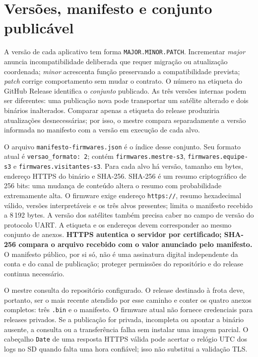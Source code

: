 \section{Versões, manifesto e conjunto publicável}
A versão de cada aplicativo tem forma \texttt{MAJOR.MINOR.PATCH}. Incrementar \emph{major} anuncia incompatibilidade deliberada que requer migração ou atualização coordenada; \emph{minor} acrescenta função preservando a compatibilidade prevista; \emph{patch} corrige comportamento sem mudar o contrato. O número na etiqueta do GitHub Release identifica o \emph{conjunto} publicado. As três versões internas podem ser diferentes: uma publicação nova pode transportar um satélite alterado e dois binários inalterados. Comparar apenas a etiqueta do release produziria atualizações desnecessárias; por isso, o mestre compara separadamente a versão informada no manifesto com a versão em execução de cada alvo.

O arquivo \texttt{manifesto-firmwares.json} é o índice desse conjunto. Seu formato atual é \texttt{versao\_formato: 2}; contém \texttt{firmwares.mestre-s3}, \texttt{firmwares.equipe-s3} e \texttt{firmwares.visitantes-s3}. Para cada alvo há versão, tamanho em bytes, endereço HTTPS do binário e SHA-256. SHA-256 é um resumo criptográfico de 256 bits: uma mudança de conteúdo altera o resumo com probabilidade extremamente alta. O firmware exige endereço \texttt{https://}, resumo hexadecimal válido, versões interpretáveis e os três alvos presentes; limita o manifesto recebido a 8\,192 bytes. A versão dos satélites também precisa caber no campo de versão do protocolo UART. A etiqueta e os endereços devem corresponder ao mesmo conjunto de anexos. \textbf{HTTPS autentica o servidor por certificado; SHA-256 compara o arquivo recebido com o valor anunciado pelo manifesto.} O manifesto público, por si só, não é uma assinatura digital independente da conta e do canal de publicação; proteger permissões do repositório e do release continua necessário.

O mestre consulta  do repositório configurado. O release destinado à frota deve, portanto, ser o mais recente atendido por esse caminho e conter os quatro anexos completos: três \texttt{.bin} e o manifesto. O firmware atual não fornece credenciais para releases privados. Se a publicação for privada, incompleta ou apontar a binário ausente, a consulta ou a transferência falha sem instalar uma imagem parcial. O cabeçalho \texttt{Date} de uma resposta HTTPS válida pode acertar o relógio UTC dos logs no SD quando falta uma hora confiável; isso não substitui a validação TLS.

